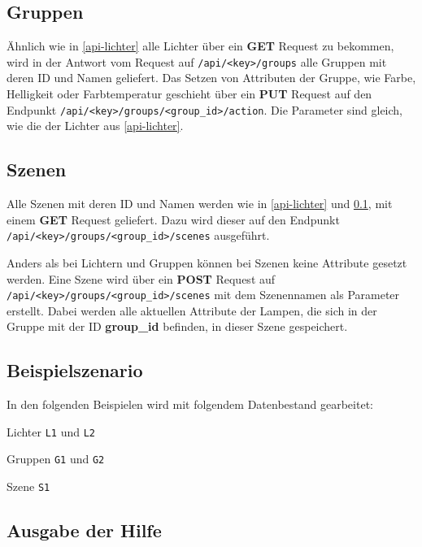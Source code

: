 \documentclass[a4paper,12pt]{article}
\begin{document}
\subsection{Gruppen}
\label{api-gruppen}

Ähnlich wie in \ref{api-lichter} alle Lichter über ein \textbf{GET}
Request zu bekommen, wird in der Antwort vom Request auf
\texttt{/api/<key>/groups} alle Gruppen mit deren ID und Namen geliefert.
Das Setzen von Attributen der Gruppe, wie Farbe, Helligkeit oder
Farbtemperatur geschieht über ein \textbf{PUT} Request auf den Endpunkt
\texttt{/api/<key>/groups/<group\_id>/action}. Die Parameter sind gleich,
wie die der Lichter aus \ref{api-lichter}.


\subsection{Szenen}
\label{api-szenen}

Alle Szenen mit deren ID und Namen werden wie in \ref{api-lichter} und
\ref{api-gruppen}, mit einem \textbf{GET} Request geliefert. Dazu wird
dieser auf den Endpunkt \newline \texttt{/api/<key>/groups/<group\_id>/scenes}
ausgeführt.

Anders als bei Lichtern und Gruppen können bei Szenen keine Attribute
gesetzt werden. Eine Szene wird über ein \textbf{POST} Request auf
\newline \texttt{/api/<key>/groups/<group\_id>/scenes} mit dem Szenennamen
als Parameter erstellt. Dabei werden alle aktuellen Attribute der Lampen,
die sich in der Gruppe mit der ID \textbf{group\_id} befinden, in dieser
Szene gespeichert.


\subsection{Beispielszenario}

In den folgenden Beispielen wird mit folgendem Datenbestand gearbeitet:

\noindent
Lichter \texttt{L1} und \texttt{L2}

\noindent
Gruppen \texttt{G1} und \texttt{G2}

\noindent
Szene \texttt{S1}

\subsection{Ausgabe der Hilfe}
\end{document}
